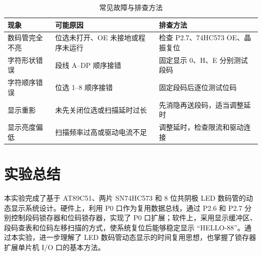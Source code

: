 \begin{table}[H]
  \centering
  \caption{常见故障与排查方法}
  \renewcommand{\arraystretch}{1.35}
  \begin{tabular}{p{}p{}p{}}
    \toprule
    现象 & 可能原因 & 排查方法 \\
    \midrule
    数码管完全不亮 & 位选未打开、OE 未接地或程序未运行 & 检查 P2.7、74HC573 OE、晶振复位 \\
    字符形状错误 & 段线 A--DP 顺序接错 & 固定显示 0、H、E 分别测试段码 \\
    字符顺序错误 & 位选 1--8 顺序接错 & 固定段码后逐位测试位码 \\
    显示重影 & 未先关闭位选或扫描延时过长 & 先消隐再送段码，适当调整延时 \\
    显示亮度偏低 & 扫描频率过高或驱动电流不足 & 调整延时，检查限流和驱动连接 \\
    \bottomrule
  \end{tabular}
\end{table}

\section{实验总结}

本实验完成了基于 AT89C51、两片 SN74HC573 和 8 位共阴极 LED 数码管的动态显示系统设计。硬件上，利用 P0 口作为复用数据总线，通过 P2.6 和 P2.7 分别控制段码锁存器和位码锁存器，实现了 P0 口扩展；软件上，采用显示缓冲区、段码查表和位码左移扫描的方式，使系统复位后能够稳定显示 ``HELLO-88''。通过本实验，进一步理解了 LED 数码管动态显示的时间复用思想，也掌握了锁存器扩展单片机 I/O 口的基本方法。
